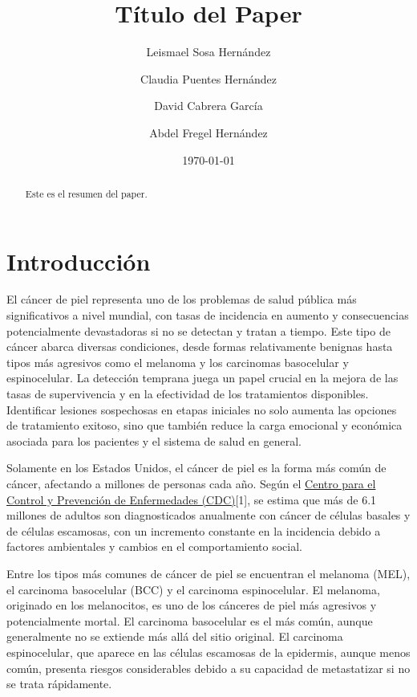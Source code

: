 \documentclass[12pt]{article}
\begin{document}
\title{Título del Paper}
\author{Leismael Sosa Hernández \and Claudia Puentes Hernández \and David Cabrera García \and Abdel Fregel Hernández}
\date{\today} %

\maketitle

\begin{abstract}
Este es el resumen del paper.
\end{abstract}


\section{Introducción}

El cáncer de piel representa uno de los problemas de salud pública más significativos a nivel mundial, con tasas de incidencia 
en aumento y consecuencias potencialmente devastadoras si no se detectan y tratan a tiempo. Este tipo de cáncer abarca diversas
condiciones, desde formas relativamente benignas hasta tipos más agresivos como el melanoma y los carcinomas basocelular y 
espinocelular. La detección temprana juega un papel crucial en la mejora de las tasas de supervivencia y en la efectividad de 
los tratamientos disponibles. Identificar lesiones sospechosas en etapas iniciales no solo aumenta las opciones de tratamiento 
exitoso, sino que también reduce la carga emocional y económica asociada para los pacientes y el sistema de salud en general.

Solamente en los Estados Unidos, el cáncer de piel es la forma más común de cáncer, afectando a millones de personas cada año. Según 
el \href{https://www.cdc.gov/skin-cancer/es/statistics/index.html}{Centro para el Control y Prevención de Enfermedades (CDC)}[1], 
se estima que más de 6.1 millones de adultos son diagnosticados anualmente con cáncer de células basales y de células escamosas, 
con un incremento constante en la incidencia debido a factores ambientales y cambios en el comportamiento social.

Entre los tipos más comunes de cáncer de piel se encuentran el melanoma (MEL), el carcinoma basocelular (BCC) y el carcinoma 
espinocelular. El melanoma, originado en los melanocitos, es uno de los cánceres de piel más agresivos y potencialmente mortal. 
El carcinoma basocelular es el más común, aunque generalmente no se extiende más allá del sitio original. El carcinoma 
espinocelular, que aparece en las células escamosas de la epidermis, aunque menos común, presenta riesgos considerables debido 
a su capacidad de metastatizar si no se trata rápidamente.
\end{document}
